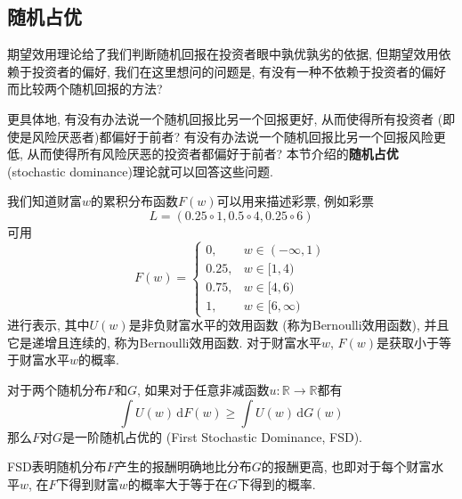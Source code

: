 \documentclass[cn, 12pt, math=mtpro2, bibstyle=apa, blue]{elegantbook}
\newcommand{\R}{\mathbb{R}}
\begin{document}
\subsection{随机占优}
期望效用理论给了我们判断随机回报在投资者眼中孰优孰劣的依据, 但期望效用依赖于投资者的偏好, 我们在这里想问的问题是, 有没有一种不依赖于投资者的偏好而比较两个随机回报的方法?

更具体地, 有没有办法说一个随机回报比另一个回报更好, 从而使得所有投资者 (即使是风险厌恶者)都偏好于前者? 有没有办法说一个随机回报比另一个回报风险更低, 从而使得所有风险厌恶的投资者都偏好于前者? 本节介绍的\textbf{随机占优 }(stochastic dominance)理论就可以回答这些问题.

我们知道财富$w$的累积分布函数$F(w)$可以用来描述彩票, 例如彩票
$$L=(0.25\circ 1, 0.5\circ 4, 0.25\circ 6)$$
可用
$$F(w)=\begin{cases}
         0, & w\in (-\infty,1) \\
         0.25, & w\in [1,4) \\
         0.75, & w\in [4,6) \\
         1, & w\in[6,\infty)
       \end{cases}$$
进行表示, 其中$U(w)$是非负财富水平的效用函数 (称为Bernoulli效用函数), 并且它是递增且连续的, 称为Bernoulli效用函数. 对于财富水平$w$, $F(w)$是获取小于等于财富水平$w$的概率.

\begin{definition}[一阶随机占优]
对于两个随机分布$F$和$G$, 如果对于任意非减函数$u:\R\to\R$都有
$$\int U(w)\,\text{d}F(w)\geq \int U(w)\,\text{d}G(w)$$
那么$F$对$G$是一阶随机占优的 (First Stochastic Dominance, FSD).
\end{definition}
FSD表明随机分布$F$产生的报酬明确地比分布$G$的报酬更高, 也即对于每个财富水平$w$, 在$F$下得到财富$w$的概率大于等于在$G$下得到的概率.
\end{document}
